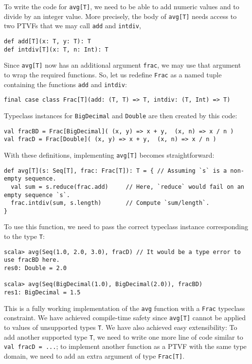 To write the code for \lstinline!avg[T]!, we need to be able to add
numeric values and to divide by an integer value. More precisely,
the body of \lstinline!avg[T]! needs access to two PTVFs that we
may call \lstinline!add! and \lstinline!intdiv!,
\begin{lstlisting}
def add[T](x: T, y: T): T
def intdiv[T](x: T, n: Int): T
\end{lstlisting}
Since \lstinline!avg[T]! now has an additional argument \lstinline!frac!,
we may use that argument to wrap the required functions. So, let us
redefine \lstinline!Frac! as a named tuple containing the functions
\lstinline!add! and \lstinline!intdiv!:
\begin{lstlisting}
final case class Frac[T](add: (T, T) => T, intdiv: (T, Int) => T)
\end{lstlisting}
Typeclass instances for \lstinline!BigDecimal! and \lstinline!Double!
are then created by this code:
\begin{lstlisting}
val fracBD = Frac[BigDecimal]( (x, y) => x + y,  (x, n) => x / n )
val fracD = Frac[Double]( (x, y) => x + y,  (x, n) => x / n )
\end{lstlisting}
With these definitions, implementing \lstinline!avg[T]! becomes straightforward:
\begin{lstlisting}
def avg[T](s: Seq[T], frac: Frac[T]): T = { // Assuming `s` is a non-empty sequence.
  val sum = s.reduce(frac.add)     // Here, `reduce` would fail on an empty sequence `s`.
  frac.intdiv(sum, s.length)       // Compute `sum/length`.
}
\end{lstlisting}
To use this function, we need to pass the correct typeclass instance
corresponding to the type \lstinline!T!:
\begin{lstlisting}
scala> avg(Seq(1.0, 2.0, 3.0), fracD) // It would be a type error to use fracBD here.
res0: Double = 2.0

scala> avg(Seq(BigDecimal(1.0), BigDecimal(2.0)), fracBD)
res1: BigDecimal = 1.5
\end{lstlisting}

This is a fully working implementation of the \lstinline!avg! function
with a \lstinline!Frac! typeclass constraint. We have achieved compile-time
safety since \lstinline!avg[T]! cannot be applied to values of unsupported
types \lstinline!T!. We have also achieved easy extensibility: To
add another supported type \lstinline!T!, we need to write one more
line of code similar to \lstinline!val fracD = ...!; to implement
another function as a PTVF with the same type domain, we need to add
an extra argument of type \lstinline!Frac[T]!.

